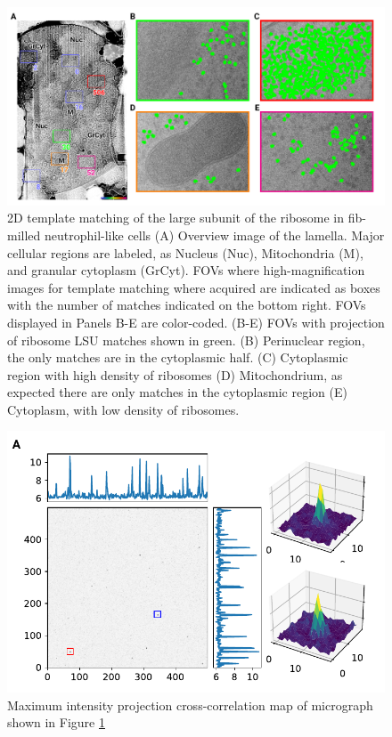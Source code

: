 \documentclass[
]{article}
\newenvironment{fignos:tagged-figure}[1][]{
    \let\oldthefigure\thefigure
    \let\oldtheHfigure\theHfigure
    \renewcommand{\thefigure}{#1}
    \renewcommand{\theHfigure}{#1}
  }{
    \let\thefigure\oldthefigure
    \let\theHfigure\oldtheHfigure
    \addtocounter{figure}{-1}
  }
\begin{document}
\begin{figure}
\hypertarget{fig:initmatching}{%
\centering
\includegraphics{figures/initmatching.pdf}
\caption{2D template matching of the large subunit of the ribosome in fib-milled neutrophil-like cells
(A) Overview image of the lamella. Major cellular regions are labeled, as Nucleus (Nuc), Mitochondria (M), and granular cytoplasm (GrCyt). FOVs where high-magnification images for template matching where acquired are indicated as boxes with the number of matches indicated on the bottom right. FOVs displayed in Panels B-E are color-coded.
(B-E) FOVs with projection of ribosome LSU matches shown in green. (B) Perinuclear region, the only matches are in the cytoplasmic half. (C) Cytoplasmic region with high density of ribosomes (D) Mitochondrium, as expected there are only matches in the cytoplasmic region (E) Cytoplasm, with low density of ribosomes.}\label{fig:initmatching}
}
\end{figure}

\begin{fignos:tagged-figure}[S1]

\begin{figure}
\hypertarget{fig:initmatching2}{%
\centering
\includegraphics{figures/initmatching2.pdf}
\caption{Maximum intensity projection cross-correlation map of micrograph shown in Figure \ref{fig:initmatching}}\label{fig:initmatching2}
}
\end{figure}

\end{fignos:tagged-figure}
\end{document}
